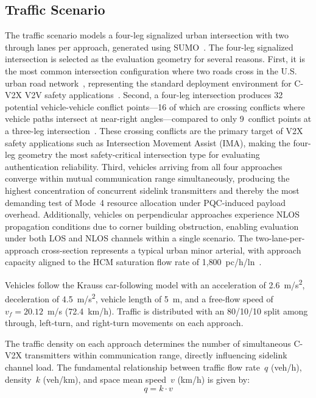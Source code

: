 \documentclass[letterpaper,journal]{IEEEtran}
\begin{document}
\subsection{Traffic Scenario}
\label{sec:traffic_scenario}

The traffic scenario models a four-leg signalized urban intersection with two through lanes per approach, generated using SUMO~\cite{lopez2018sumo}. The four-leg signalized intersection is selected as the evaluation geometry for several reasons. First, it is the most common intersection configuration where two roads cross in the U.S. urban road network~\cite{fhwa_sig_guide}, representing the standard deployment environment for C-V2X V2V safety applications~\cite{sae_j3161}. Second, a four-leg intersection produces 32 potential vehicle-vehicle conflict points---16 of which are crossing conflicts where vehicle paths intersect at near-right angles---compared to only 9~conflict points at a three-leg intersection~\cite{fhwa_sig_guide}. These crossing conflicts are the primary target of V2X safety applications such as Intersection Movement Assist (IMA), making the four-leg geometry the most safety-critical intersection type for evaluating authentication reliability. Third, vehicles arriving from all four approaches converge within mutual communication range simultaneously, producing the highest concentration of concurrent sidelink transmitters and thereby the most demanding test of Mode~4 resource allocation under PQC-induced payload overhead. Additionally, vehicles on perpendicular approaches experience NLOS propagation conditions due to corner building obstruction, enabling evaluation under both LOS and NLOS channels within a single scenario. The two-lane-per-approach cross-section represents a typical urban minor arterial, with approach capacity aligned to the HCM saturation flow rate of 1{,}800~pc/h/ln~\cite{hcm2010}.

Vehicles follow the Krauss car-following model with an acceleration of 2.6~m/s\textsuperscript{2}, deceleration of 4.5~m/s\textsuperscript{2}, vehicle length of 5~m, and a free-flow speed of $v_f = 20.12$~m/s (72.4~km/h). Traffic is distributed with an 80/10/10 split among through, left-turn, and right-turn movements on each approach.

The traffic density on each approach determines the number of simultaneous C-V2X transmitters within communication range, directly influencing sidelink channel load. The fundamental relationship between traffic flow rate~$q$ (veh/h), density~$k$ (veh/km), and space mean speed~$v$ (km/h) is given by:
\begin{equation}
    q = k \cdot v
    \label{eq:flow_density}
\end{equation}
\end{document}
